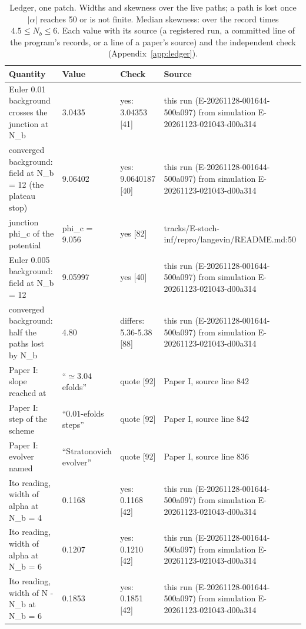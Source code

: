 \begin{table}
\caption{Ledger, one patch. Widths and skewness over the live paths; a path is lost once $|\alpha|$ reaches 50 or is not finite. Median skewness: over the record times $4.5 \le N_b \le 6$. Each value with its source (a registered run, a committed line of the program's records, or a line of a paper's source) and the independent check (Appendix~\ref{app:ledger}).}
\label{tab:ledgeronepatch}
\footnotesize
\begin{tabular}{p{}p{}p{}p{}}
\toprule
Quantity & Value & Check & Source \\
\midrule
Euler 0.01 background crosses the junction at N\_b & 3.0435 & yes: 3.04353 [41] & this run (E-20261128-001644-500a097) from simulation E-20261123-021043-d00a314 \\
converged background: field at N\_b = 12 (the plateau stop) & 9.06402 & yes: 9.0640187 [40] & this run (E-20261128-001644-500a097) from simulation E-20261123-021043-d00a314 \\
junction phi\_c of the potential & phi\_c = 9.056 & yes [82] & tracks/\allowbreak{}E-stoch-inf/\allowbreak{}repro/\allowbreak{}langevin/\allowbreak{}README.md:50 \\
Euler 0.005 background: field at N\_b = 12 & 9.05997 & yes [40] & this run (E-20261128-001644-500a097) from simulation E-20261123-021043-d00a314 \\
converged background: half the paths lost by N\_b & 4.80 & differs: 5.36-5.38 [88] & this run (E-20261128-001644-500a097) from simulation E-20261123-021043-d00a314 \\
Paper I: slope reached at & ``$\simeq 3.04$ efolds'' & quote [92] & Paper I, source line 842 \\
Paper I: step of the scheme & ``$0.01$-efolds steps'' & quote [92] & Paper I, source line 842 \\
Paper I: evolver named & ``Stratonovich evolver'' & quote [92] & Paper I, source line 836 \\
Ito reading, width of alpha at N\_b = 4 & 0.1168 & yes: 0.1168 [42] & this run (E-20261128-001644-500a097) from simulation E-20261123-021043-d00a314 \\
Ito reading, width of alpha at N\_b = 6 & 0.1207 & yes: 0.1210 [42] & this run (E-20261128-001644-500a097) from simulation E-20261123-021043-d00a314 \\
Ito reading, width of N - N\_b at N\_b = 6 & 0.1853 & yes: 0.1851 [42] & this run (E-20261128-001644-500a097) from simulation E-20261123-021043-d00a314 \\

\end{tabular}
\end{table}

